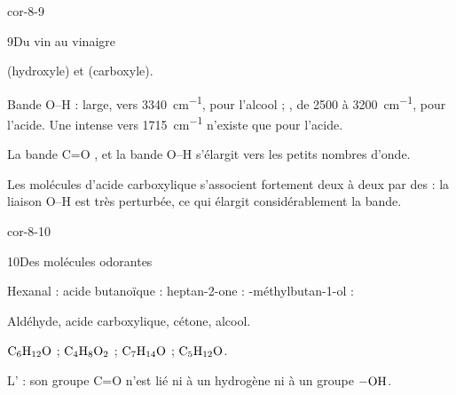 \begin{blocLivre}{cor-8-9}
\begin{corrige}{9}{Du vin au vinaigre}
\begin{questions}
\item {} (hydroxyle) et  (carboxyle).
\item Bande O--H : large, vers \qty{3340}{cm^{-1}}, pour l'alcool ; , de 2500 à \qty{3200}{cm^{-1}}, pour l'acide. Une
 intense vers \qty{1715}{cm^{-1}} n'existe que pour l'acide.
\item La bande C=O , et la bande O--H s'élargit vers les petits nombres d'onde.
\item Les molécules d'acide carboxylique s'associent fortement deux à deux par des  : la liaison O--H est
très perturbée, ce qui élargit considérablement la bande.
\end{questions}
\end{corrige}
\end{blocLivre}
\begin{blocLivre}{cor-8-10}
\begin{corrige}{10}{Des molécules odorantes}
\begin{questions}
\item Hexanal : \newline acide butanoïque : \newline
heptan-2-one : -méthylbutan-1-ol : 
\item Aldéhyde, acide carboxylique, cétone, alcool.
\item $\ce{C6H12O}$ ; $\ce{C4H8O2}$ ; $\ce{C7H14O}$ ; $\ce{C5H12O}$.
\item L' : son groupe C=O n'est lié ni à un hydrogène ni à un groupe $\ce{-OH}$.
\end{questions}
\end{corrige}
\end{blocLivre}
